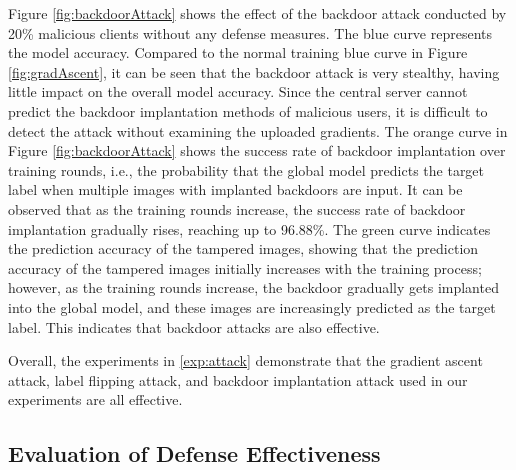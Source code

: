 \documentclass[conference]{IEEEtran}
\begin{document}
Figure \hyperref[fig:backdoorAttack]{\ref{fig:backdoorAttack}} shows the effect of the backdoor attack conducted by 20\% malicious clients without any defense measures. The blue curve represents the model accuracy. Compared to the normal training blue curve in Figure \hyperref[fig:gradAscent]{\ref{fig:gradAscent}}, it can be seen that the backdoor attack is very stealthy, having little impact on the overall model accuracy. Since the central server cannot predict the backdoor implantation methods of malicious users, it is difficult to detect the attack without examining the uploaded gradients. The orange curve in Figure \hyperref[fig:backdoorAttack]{\ref{fig:backdoorAttack}} shows the success rate of backdoor implantation over training rounds, i.e., the probability that the global model predicts the target label when multiple images with implanted backdoors are input. It can be observed that as the training rounds increase, the success rate of backdoor implantation gradually rises, reaching up to 96.88\%. The green curve indicates the prediction accuracy of the tampered images, showing that the prediction accuracy of the tampered images initially increases with the training process; however, as the training rounds increase, the backdoor gradually gets implanted into the global model, and these images are increasingly predicted as the target label. This indicates that backdoor attacks are also effective.


Overall, the experiments in \hyperref[exp:attack]{\ref{exp:attack}} demonstrate that the gradient ascent attack, label flipping attack, and backdoor implantation attack used in our experiments are all effective.

\subsection{Evaluation of Defense Effectiveness}
\label{exp:defense}

\end{document}
